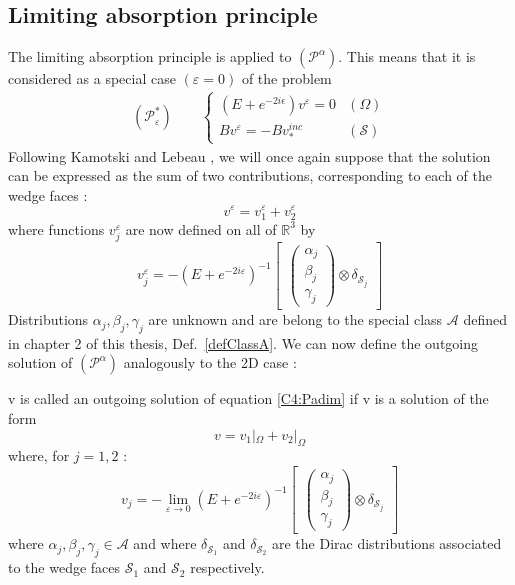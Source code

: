 \subsection{Limiting absorption principle}
The limiting absorption principle is applied to $(\mathcal{P}^{\alpha})$. This means that it is considered as a special case $(\varepsilon=0)$ of the problem
\begin{eqnarray}
(\mathcal{P}^*_{\varepsilon}) \hspace{2em} \left\{
\begin{array}{lr}
(E+e^{-2i\epsilon})v^{\varepsilon}=0 & (\Omega) \\
Bv^{\varepsilon}=-Bv_*^{inc} & (\mathcal{S})
\end{array}
\right.
\label{C4:Pabs}
\end{eqnarray}
Following Kamotski and Lebeau \cite{KamotskiLebeau}, we will once again suppose that the solution can be expressed as the sum of two contributions, corresponding to each of the wedge faces :
\begin{equation}
v^{\varepsilon}=v_1^{\varepsilon}+v_2^{\varepsilon}
\label{C4:v1+v2}
\end{equation}
where functions $v_j^{\varepsilon}$ are now defined on all of  $\mathbb{R}^3$ by
\begin{equation}
v_j^{\varepsilon}=-(E+e^{-2i\varepsilon})^{-1} \begin{bmatrix}
\begin{pmatrix}
\alpha_j \\
\beta_j \\
\gamma_j
\end{pmatrix}
\otimes \delta_{\mathcal{S}_j}
\end{bmatrix}
\label{C4:vjdef}
\end{equation}
Distributions $\alpha_j,\beta_j, \gamma_j $ are unknown and are belong to the special class $\mathcal{A}$ defined in chapter 2 of this thesis, Def.~\ref{defClassA}. We can now define the outgoing solution of $(\mathcal{P}^{\alpha})$ analogously to the 2D case :
\begin{definition}
	 v is called an outgoing solution of equation \eqref{C4:Padim} if v is a solution of the form
	\begin{equation}
	\label{C4:decomposition}
	v=v_1|_{\Omega}+v_2|_{\Omega}
	\end{equation}
	where, for $j=1,2$ :
	\begin{equation}
	\label{C4:inv_potentiels}
	v_j=-\lim_{\varepsilon \to 0} (E+e^{-2i\varepsilon})^{-1} \begin{bmatrix}
\begin{pmatrix}
\alpha_j \\
\beta_j \\
\gamma_j
\end{pmatrix}
\otimes \delta_{\mathcal{S}_j}
\end{bmatrix}
	\end{equation}
	where $\alpha_j,\beta_j,\gamma_j \in \mathcal{A}$ and where $\delta_{\mathcal{S}_1}$ and $\delta_{\mathcal{S}_2}$ are the Dirac distributions associated to the wedge faces $\mathcal{S}_1$ and $\mathcal{S}_2$ respectively.
\end{definition}
